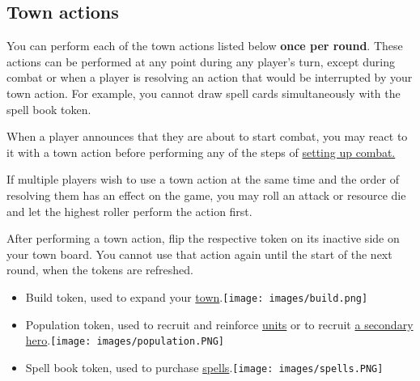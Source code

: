 \documentclass[12pt]{article}
\begin{document}
\clearpage

\subsection*{Town actions}
You can perform each of the town actions listed below \textbf{once per round}. These actions can be performed at any point during any player’s turn, except during combat or when a player is resolving an action that would be interrupted by your town action. For example, you cannot draw spell cards simultaneously with the spell book token.\par
When a player announces that they are about to start combat, you may react to it with a town action before performing any of the steps of \hyperlink{Combatsetup}{setting up combat.}\par
If multiple players wish to use a town action at the same time and the order of resolving them has an effect on the game, you may roll an attack or resource die and let the highest roller perform the action first.\par
After performing a town action, flip the respective token on its inactive side on your town board. You cannot use that action again until the start of the next round, when the tokens are refreshed.
\begin{itemize}
\item Build token, used to expand your \hyperlink{Town}{town}.\texttt{[image: images/build.png]}
\item Population token, used to recruit and reinforce \hyperlink{Units}{units} or to recruit \hyperlink{Secondary}{a secondary hero}.\texttt{[image: images/population.PNG]}
\item Spell book token, used to purchase \hyperlink{spells}{spells}.\texttt{[image: images/spells.PNG]}
\end{itemize}
\end{document}
